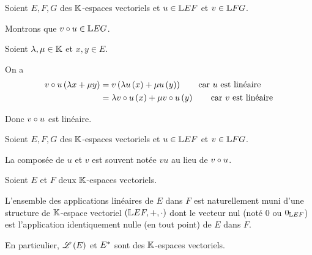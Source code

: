 \begin{dem}
Soient \(E,F,G\) des \(\mathbb{K}\)-espaces vectoriels et \(u\in\mathbb{L}{E}{F}\) et \(v\in\mathbb{L}{F}{G}\).

Montrons que \(v\circ u\in\mathbb{L}{E}{G}\).

Soient \(\lambda,\mu\in\mathbb{K}\) et \(x,y\in E\).

On a \[\begin{aligned}
v\circ u\left(\lambda x+\mu y\right)&=v\left(\lambda u\left(x\right)+\mu u\left(y\right)\right)\qquad\text{car }u\text{ est linéaire} \\
&=\lambda v\circ u\left(x\right)+\mu v\circ u\left(y\right)\qquad\text{car }v\text{ est linéaire}
\end{aligned}\]

Donc \(v\circ u\) est linéaire.
\end{dem}

\begin{nota}
Soient \(E,F,G\) des \(\mathbb{K}\)-espaces vectoriels et \(u\in\mathbb{L}{E}{F}\) et \(v\in\mathbb{L}{F}{G}\).

La composée de \(u\) et \(v\) est souvent notée \(vu\) au lieu de \(v\circ u\).
\end{nota}

\begin{prop}
Soient \(E\) et \(F\) deux \(\mathbb{K}\)-espaces vectoriels.

L'ensemble des applications linéaires de \(E\) dans \(F\) est naturellement muni d'une structure de \(\mathbb{K}\)-espace vectoriel \(\corps{\L{E}{F}}[+][\cdot]\) dont le vecteur nul (noté \(0\) ou \(0_{\mathbb{L}{E}{F}}\)) est l'application identiquement nulle (\ie en tout point) de \(E\) dans \(F\).

En particulier, \(\mathscr{L}\left(E\right)\) et \(E^{*}\) sont des \(\mathbb{K}\)-espaces vectoriels.
\end{prop}

